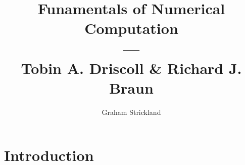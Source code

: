\documentclass{article}
\title{Funamentals of Numerical Computation\\---\\Tobin A. Driscoll \& Richard J. Braun}
\author{Graham Strickland}
\begin{document}
\maketitle  

\section{Introduction}

\end{document}

